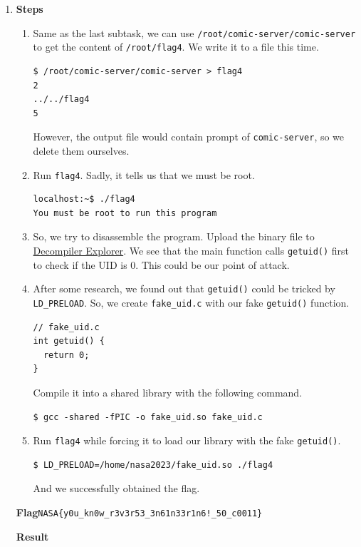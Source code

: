 \documentclass[12pt, a4paper]{article}
\begin{document}
\begin{enumerate}[label=(\alph*)]
    \pagebreak
    \item \textbf{Steps}
    \begin{enumerate}[label=(\arabic*)]
      \item Same as the last subtask, we can use \verb|/root/comic-server/comic-server|
      to get the content of \verb|/root/flag4|. We write it to a file this time.
      \begin{Verbatim}[frame=single, fontsize=\small]
$ /root/comic-server/comic-server > flag4
2
../../flag4
5
      \end{Verbatim}
      However, the output file would contain prompt of \verb|comic-server|, so we delete
      them ourselves.

      \item Run \verb|flag4|. Sadly, it tells us that we must be root.
      \begin{Verbatim}[frame=single]
localhost:~$ ./flag4
You must be root to run this program
      \end{Verbatim}
      \item So, we try to disassemble the program. Upload the binary file to
      \href{https://dogbolt.org/}{Decompiler Explorer}.
      We see that the main function calls \verb|getuid()| first to check if the
      UID is 0. This could be our point of attack.
      \item After some research, we found out that \verb|getuid()| could be tricked
      by \verb|LD_PRELOAD|. So, we create \verb|fake_uid.c| with our fake \verb|getuid()|
      function.
      \begin{verbatim}
// fake_uid.c
int getuid() {
  return 0;
}
      \end{verbatim}
      Compile it into a shared library with the following command.
      \begin{Verbatim}[frame=single]
$ gcc -shared -fPIC -o fake_uid.so fake_uid.c
      \end{Verbatim}

      \item Run \verb|flag4| while forcing it to load our library with the fake \verb|getuid()|.
      \begin{Verbatim}[frame=single]
$ LD_PRELOAD=/home/nasa2023/fake_uid.so ./flag4
      \end{Verbatim}
      And we successfully obtained the flag.
    \end{enumerate}
    \textbf{Flag}\quad\verb|NASA{y0u_kn0w_r3v3r53_3n61n33r1n6!_50_c0011}|

    \textbf{Result}


\end{enumerate}
\end{document}

